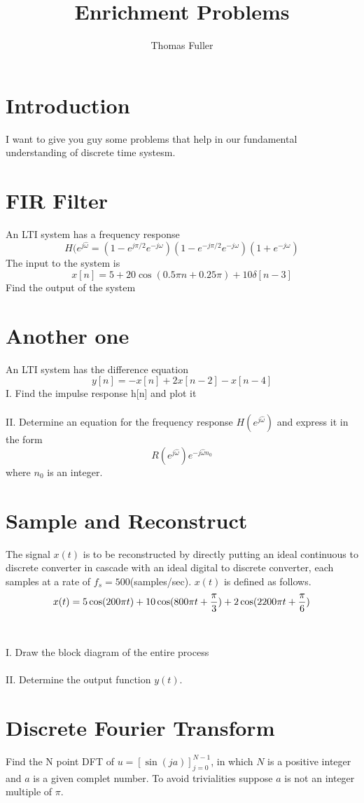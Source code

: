 \documentclass[10pt,a4paper]{article}
\author{Thomas Fuller}
\title{Enrichment Problems}
\begin{document}
\maketitle
\section*{Introduction}
I want to give you guy some problems that help in our fundamental understanding of discrete time systesm.
\section*{FIR Filter}
An LTI system has a frequency response
\begin{equation*}
H(e^{j\hat{\omega}} = (1 -e^{j\pi/2}e^{-j\omega})(1 -e^{-j\pi/2}e^{-j\omega})(1 +e^{-j\omega})
\end{equation*}
The input to the system is 
\begin{equation*}
x[n] = 5 + 20\cos(0.5 \pi n + 0.25 \pi) + 10\delta[n-3]
\end{equation*} 
Find the output of the system

\section*{Another one}
An LTI system has the difference equation
\begin{equation*}
y[n] = -x[n] + 2x[n-2] - x[n-4]
\end{equation*}
I. Find the impulse response h[n]  and plot it
\\ \\
II. Determine an equation for the frequency response $H(e^{j\hat{\omega}})$ and express it in the form
\begin{equation*}
R(e^{j\hat{\omega}})e^{-j \hat{\omega}n_{0}}
\end{equation*}
where $n_{0}$ is an integer.
\section*{Sample and Reconstruct}
The signal $x(t)$ is to be reconstructed by directly putting an ideal continuous to discrete converter in cascade with an ideal digital to discrete converter, each samples at a rate of $f_{s} = 500$(samples/sec). $x(t)$ is defined as follows. 
\begin{equation*}
x(t) = 5\cos(200 \pi t) + 10 \cos(800 \pi t + \frac{\pi}{3}) + 2\cos(2200 \pi t + \frac{\pi}{6})
\\ \\
\end{equation*}
\\ \\
I.  Draw the block diagram of the entire process
\\ \\
II.  Determine the output function $y(t)$.  
\section*{Discrete Fourier Transform}
Find the N point DFT of $u = [\sin(ja)]_{j=0}^{N-1}$, in which $N$ is  a positive integer and $a$ is a given complet number.  To avoid trivialities suppose $a$ is not an integer multiple of $\pi$. 
\end{document}

